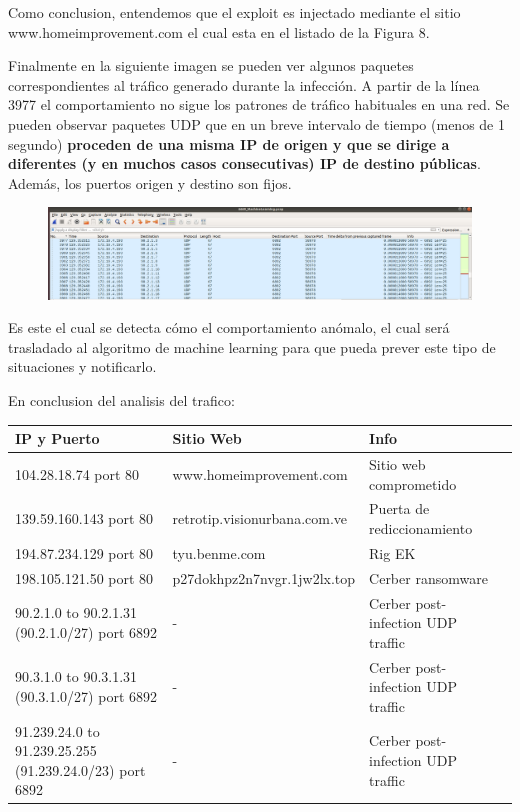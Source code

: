 \documentclass[a4paper,10pt]{article}
\begin{document}
\medskip

\newpage
Como conclusion, entendemos que el exploit es injectado mediante el sitio www.homeimprovement.com el cual esta en el listado de la Figura 8.

\medskip

Finalmente en la siguiente imagen se pueden ver algunos paquetes correspondientes al tráfico generado durante la infección. A partir de la línea 3977 el comportamiento no sigue los patrones de tráfico habituales en una red. Se pueden observar paquetes UDP que en un breve intervalo de tiempo (menos de 1 segundo) \textbf{proceden de una misma IP de origen y que se dirige a diferentes (y en muchos casos consecutivas) IP de destino públicas}. Además, los puertos origen y destino son fijos.

\begin{figure}[!htp]
\centering
\includegraphics[scale=0.3]{Wireshark/6.png} 
\caption{}
\end{figure}

\medskip

Es este el cual se detecta cómo el comportamiento anómalo, el cual será trasladado al algoritmo de machine learning para que pueda prever este tipo de situaciones y notificarlo.

\medskip

\newpage
En conclusion del analisis del trafico:







\begin{table}[htbp]
\begin{center}
\begin{tabular}{|l|l|l|l|}
\hline
IP y Puerto & Sitio Web & Info \\
\hline
104.28.18.74 port 80  & www.homeimprovement.com & Sitio web comprometido  \\
139.59.160.143 port 80 & retrotip.visionurbana.com.ve & Puerta de rediccionamiento\\
194.87.234.129 port 80 & tyu.benme.com & Rig EK\\
198.105.121.50 port 80 & p27dokhpz2n7nvgr.1jw2lx.top & Cerber ransomware\\
90.2.1.0 to 90.2.1.31 (90.2.1.0/27) port 6892 & - & Cerber post-infection UDP traffic\\
90.3.1.0 to 90.3.1.31 (90.3.1.0/27) port 6892 & -  & Cerber post-infection UDP traffic\\
91.239.24.0 to 91.239.25.255 (91.239.24.0/23) port 6892 & - & Cerber post-infection
UDP traffic\\

\hline

\end{tabular}
\label{tabla:sencilla}
\end{center}
\end{table}
\end{document}
